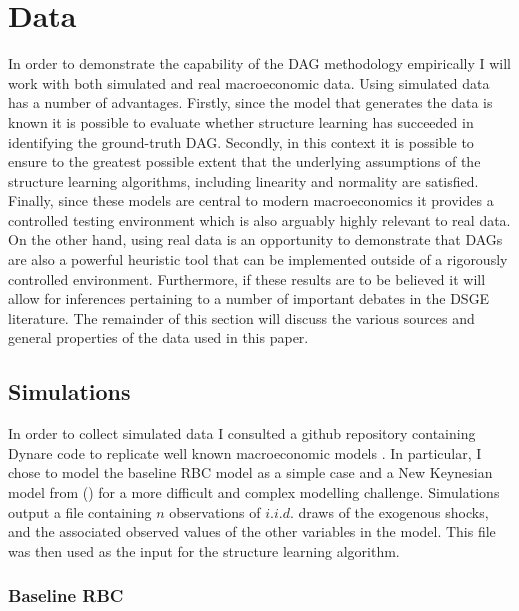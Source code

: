\documentclass{article}
\begin{document}
\section{Data} \label{data}

In order to demonstrate the capability of the DAG methodology empirically I will work with both simulated and real macroeconomic data. Using simulated data has a number of advantages. Firstly, since the model that generates the data is known it is possible to evaluate whether structure learning has succeeded in identifying the ground-truth DAG. Secondly, in this context it is possible to ensure to the greatest possible extent that the underlying assumptions of the structure learning algorithms, including linearity and normality are satisfied. Finally, since these models are central to modern macroeconomics it provides a controlled testing environment which is also arguably highly relevant to real data. On the other hand, using real data is an opportunity to demonstrate that DAGs are also a powerful heuristic tool that can be implemented outside of a rigorously controlled environment. Furthermore, if these results are to be believed it will allow for inferences pertaining to a number of important debates in the DSGE literature. The remainder of this section will discuss the various sources and general properties of the data used in this paper.

\subsection{Simulations}

In order to collect simulated data I consulted a github repository containing Dynare code to replicate well known macroeconomic models \parencite{pfeifer2020}. In particular, I chose to model the baseline RBC model as a simple case and a New Keynesian model from \citeauthor{gali2015monetary} (\citeyear{gali2015monetary}) for a more difficult and complex modelling challenge. Simulations output a file containing $n$ observations of $i.i.d.$ draws of the exogenous shocks, and the associated observed values of the other variables in the model. This file was then used as the input for the structure learning algorithm.

\subsubsection{Baseline RBC}
\end{document}
